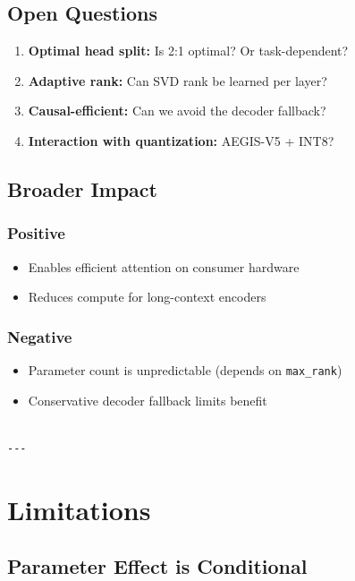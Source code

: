 \subsection{Open Questions}

\begin{enumerate}
\item \textbf{Optimal head split:} Is 2:1 optimal? Or task-dependent?
\item \textbf{Adaptive rank:} Can SVD rank be learned per layer?
\item \textbf{Causal-efficient:} Can we avoid the decoder fallback?
\item \textbf{Interaction with quantization:} AEGIS-V5 + INT8?

\end{enumerate}
\subsection{Broader Impact}

\subsubsection{Positive}
\begin{itemize}
\item Enables efficient attention on consumer hardware
\item Reduces compute for long-context encoders

\end{itemize}
\subsubsection{Negative}
\begin{itemize}
\item Parameter count is unpredictable (depends on \texttt{max\_rank})
\item Conservative decoder fallback limits benefit
\end{itemize}
\begin{lstlisting}

---
\end{lstlisting}

\section{Limitations}

\subsection{Parameter Effect is Conditional}

